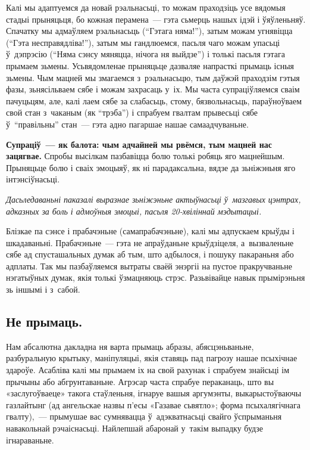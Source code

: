 Калі мы адаптуемся да новай рэальнасьці, то можам праходзіць усе вядомыя стадыі прыняцьця, бо кожная перамена~--- гэта сьмерць нашых ідэй і ўяўленьняў. Спачатку мы адмаўляем рэальнасьць (``Гэтага няма!''), затым можам угнявіцца (``Гэта несправядліва!''), затым мы гандлюемся, пасьля чаго можам упасьці ў~дэпрэсію (``Няма сэнсу мяняцца, нічога ня выйдзе'') і толькі пасьля гэтага прымаем зьмены. Усьвядомленае прыняцьце дазваляе напрасткі прымаць існыя зьмены. Чым мацней мы змагаемся з~рэальнасьцю, тым даўжэй праходзім гэтыя фазы, зьнясільваем сябе і можам захрасаць у~іх. Мы часта супраціўляемся сваім пачуцьцям, але, калі лаем сябе за слабасьць, стому, бязвольнасьць, параўноўваем свой стан з~чаканым (як ``трэба'') і спрабуем гвалтам прывесьці сябе ў~``правільны'' стан~--- гэта адно пагаршае нашае самаадчуваньне.

\textbf{Супраціў~--- як балота: чым адчайней мы рвёмся, тым мацней нас зацягвае.} Спробы высілкам пазбавіцца болю толькі робяць яго мацнейшым. Прыняцьце болю і сваіх эмоцыяў, як ні парадаксальна, вядзе да зьніжэньня яго інтэнсіўнасьці.

\emph{Дасьледаваньні паказалі выразнае зьніжэньне актыўнасьці ў~мазгавых цэнтрах, адказных за боль і адмоўныя эмоцыі, пасьля 20-хвіліннай мэдытацыі.}

Блізкае па сэнсе і прабачэньне (самапрабачэньне), калі мы адпускаем крыўды і шкадаваньні. Прабачэньне~--- гэта не апраўданьне крыўдзіцеля, а~вызваленьне сябе ад спусташальных думак аб тым, што адбылося, і пошуку пакараньня або адплаты. Так мы пазбаўляемся вытраты сваёй энэргіі на пустое пракручваньне нэгатыўных думак, якія толькі ўзмацняюць стрэс. Разьвівайце навык прымірэньня зь іншымі і з~сабой.

\subsection*{Не прымаць.}

Нам абсалютна дакладна ня варта прымаць абразы, абясцэньваньне, разбуральную крытыку, маніпуляцыі, якія ставяць пад пагрозу нашае псыхічнае здароўе. Асабліва калі мы прымаем іх на свой рахунак і спрабуем знайсьці ім прычыны або абгрунтаваньне. Агрэсар часта спрабуе пераканаць, што вы «заслугоўваеце» такога стаўленьня, ігнаруе вашыя аргумэнты, выкарыстоўваючы газлайтынг (ад ангельскае назвы п'есы «Газавае сьвятло»; форма псыхалягічнага гвалту),~--- прымушае вас сумнявацца ў~адэкватнасьці свайго ўспрыманьня навакольнай рэчаіснасьці. Найлепшай абаронай у~такім выпадку будзе ігнараваньне.

